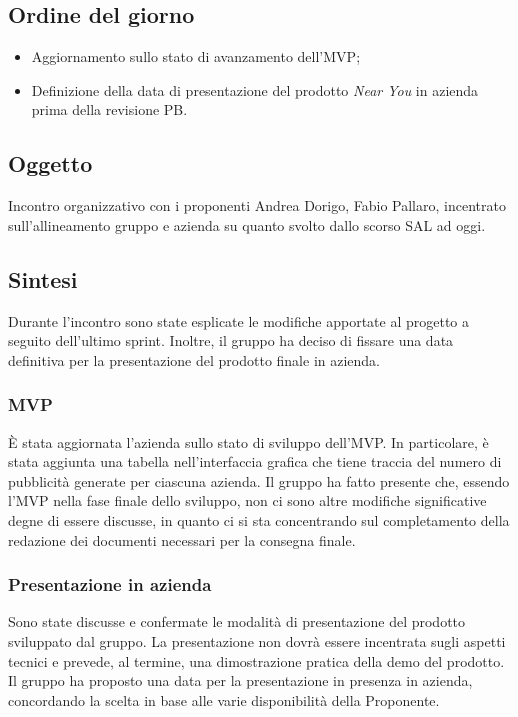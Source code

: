 \documentclass[10pt]{article}
\begin{document}
\subsection{Ordine del giorno}
\begin{itemize}
    \item Aggiornamento sullo stato di avanzamento dell’MVP;
    \item Definizione della data di presentazione del prodotto \textit{Near You} in azienda prima della revisione PB.
\end{itemize}

\subsection{Oggetto}
Incontro organizzativo con i proponenti Andrea Dorigo, Fabio Pallaro, incentrato sull'allineamento gruppo e azienda su quanto svolto dallo scorso SAL ad oggi.

\subsection{Sintesi}
Durante l'incontro sono state esplicate le modifiche apportate al progetto a seguito dell'ultimo sprint. Inoltre, il gruppo ha deciso di fissare una data definitiva per la presentazione del prodotto finale in azienda.

    
    \subsubsection{MVP}
    È stata aggiornata l'azienda sullo stato di sviluppo dell'MVP. In particolare, è stata aggiunta una tabella nell'interfaccia grafica che tiene traccia del numero di pubblicità generate per ciascuna azienda. Il gruppo ha fatto presente che, essendo l'MVP nella fase finale dello sviluppo, non ci sono altre modifiche significative degne di essere discusse, in quanto ci si sta concentrando sul completamento della redazione dei documenti necessari per la consegna finale.

    \subsubsection{Presentazione in azienda}
    Sono state discusse e confermate le modalità di presentazione del prodotto sviluppato dal gruppo. La presentazione non dovrà essere incentrata sugli aspetti tecnici e prevede, al termine, una dimostrazione pratica della demo del prodotto. Il gruppo ha proposto una data per la presentazione in presenza in azienda, concordando la scelta in base alle varie disponibilità della Proponente.
\end{document}
